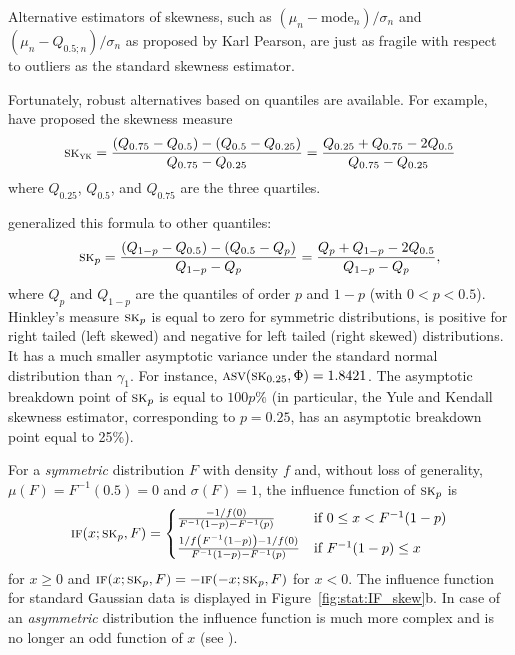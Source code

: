 Alternative estimators of skewness, such as $(\mu_n-\text{mode}_n)/\sigma_n$ 
and $(\mu_n-Q_{0.5;n})/\sigma_n$ as proposed by Karl Pearson,
are just as fragile with respect to outliers as the standard
skewness estimator. 

Fortunately, robust alternatives based on quantiles are
available. For example, \citet{Yule:Kendall:1968} have proposed the skewness measure
\[
    \stsc{SK}_{\stsc{YK}}
    = \frac{(Q_{0.75} - Q_{0.5}) - (Q_{0.5}-Q_{0.25})}{Q_{0.75} - Q_{0.25}}
    = \frac{Q_{0.25} + Q_{0.75} - 2Q_{0.5}}{Q_{0.75} - Q_{0.25}}
\]
where $Q_{0.25}$, $Q_{0.5}$, and $Q_{0.75}$ are the three quartiles.

\citet{hinkley:1975} generalized this formula to other quantiles:
\[
    \stsc{SK}_p 
    = \frac{(Q_{1-p} - Q_{0.5}) - (Q_{0.5} - Q_p)}{Q_{1-p} - Q_p}
    = \frac{Q_p + Q_{1-p} - 2Q_{0.5}}{Q_{1-p} - Q_p},
\]
where $Q_p$ and $Q_{1-p}$ are the quantiles of order $p$ and $1-p$ (with
$0<p<0.5$). Hinkley's measure $\stsc{SK}_p$ is equal to zero for symmetric
distributions, is positive for right tailed (left skewed) and negative for left
tailed (right skewed) distributions. It has a much smaller asymptotic variance
under the standard normal distribution than $\gamma_1$. For instance,
$\stsc{ASV}(\stsc{SK}_{0.25}, \Phi) = 1.8421$.                                  
The asymptotic breakdown point of $\stsc{SK}_p$ is equal to $100p\%$ (in
particular, the Yule and Kendall skewness estimator, corresponding to $p=0.25$,
has an asymptotic breakdown point equal to 25\%).

For a \emph{symmetric} distribution $F$ with density $f$ and, without loss of
generality, $\mu(F) = F^{-1}(0.5) = 0$ and $\sigma(F) = 1$, the influence
function of $\stsc{SK}_p$ is
\[
    \stsc{IF}(x; \stsc{SK}_p, F) =
    \begin{cases}
        \frac{-1 / f(0)}{F^{-1}(1-p) - F^{-1}(p)}                            & \text{if $0\leq x < F^{-1}(1-p)$} \\[1ex]
        \frac{1/f\left(F^{-1}(1-p)\right) - 1/f(0)}{F^{-1}(1-p) - F^{-1}(p)} & \text{if $F^{-1}(1-p)\leq x$}
    \end{cases}
\]
for $x \geq 0$ and $\stsc{IF}(x; \stsc{SK}_p, F) = -\stsc{IF}(-x;
\stsc{SK}_p, F)$ for $x<0$. The influence function for standard Gaussian data
is displayed in Figure~\ref{fig:stat:IF_skew}b. In case of an
\emph{asymmetric} distribution the influence function is much more complex
and is no longer an odd function of $x$ (see \citealp[p.~101]{groeneveld:1991}).

